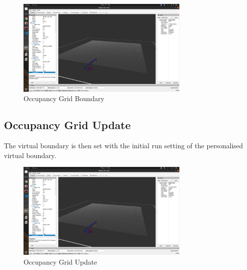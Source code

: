 \begin{figure}[!ht]
	\begin{center}
		\includegraphics[width=0.75\textwidth]{Images/5-Results/OccupancyGrid.png}
	\end{center}
	\caption{Occupancy Grid Boundary}
	\label{fig:occGridBoud}
\end{figure}


\subsection{Occupancy Grid Update}
\noindent
The virtual boundary is then set with the initial run setting of the personalised virtual boundary.


\begin{figure}[!ht]
	\begin{center}
		\includegraphics[width=0.75\textwidth]{Images/5-Results/OccupancyGrid.png}
	\end{center}
	\caption{Occupancy Grid Update}
	\label{fig:occGridUpdate}
\end{figure}




\cleardoublepage
